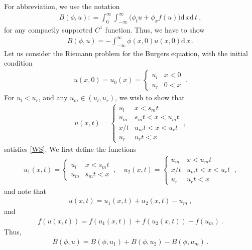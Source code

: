 \documentclass[10pt,letterpaper]{article}
\newcommand{\dif}[1][]{\mathrm{d} {#1}\,}
\newcommand{\rb}[1]{ \left(  {#1} \right) }
\newcommand{\frb}[1]{ \left(  {#1} \right) }
\theoremstyle{break}
\begin{document}
\begin{solution}
	For abbreviation, we use the notation
	\begin{gather}
		B\frb{\phi,u}: =\int_0^\infty \int_{-\infty}^\infty \Big(\phi_t u +\phi_x f(u)\Big)\dif x\dif t\ ,
	\end{gather}
	for any compactly supported $C^1$ function. Thus, we have to show
	\begin{gather} \label{WS}
		B\frb{\phi,u}=-\int_{-\infty}^\infty \phi(x,0)u(x,0)\dif x\ .
	\end{gather}
	Let us consider the Riemann problem for the Burgers equation, with the initial condition
	\begin{gather} 
		u(x,0)=u_0(x)=\begin{cases}
				u_l & x<0\\
				u_r & 0<x
			\end{cases}\ .
	\end{gather}
	For $u_l<u_r$, and any $u_m\in\rb{u_l,u_r}$, we wish to show that
	\begin{gather}
		u(x,t)=\begin{cases}
				u_l & x<s_mt\\
				u_m & s_mt<x<u_mt\\
				x/t & u_mt<x<u_rt\\
				u_r & u_rt<x
			\end{cases}\ ,
	\end{gather}
	satisfies \eqref{WS}. We first define the functions
	\begin{gather}
		u_1(x,t)=\begin{cases}
				u_l & x<s_mt\\
				u_m & s_mt<x
			\end{cases}\ ,
		\quad
		u_2(x,t)=\begin{cases}
				u_m & x<u_mt \\
				x/t & u_mt<x<u_rt\\
				u_r & u_rt<x
			\end{cases}\ ,
	\end{gather}
	and note that
	\begin{gather}
		u(x,t)=u_1(x,t)+u_2(x,t)-u_m\ ,
	\end{gather}
	and
	\begin{gather} \label{fsum}
		f\frb{u(x,t)}=f\frb{u_1(x,t)}+f\frb{u_2(x,t)}-f\frb{u_m}\ .
	\end{gather}
	Thus,
	\begin{gather} \label{Bsum}
		B\frb{\phi,u}=B\frb{\phi,u_1}+B\frb{\phi,u_2}-B\frb{\phi,u_m}\ .
	\end{gather}

\end{solution}
\end{document}
